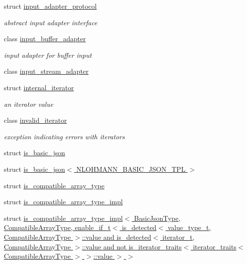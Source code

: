 \begin{DoxyCompactItemize}
struct \hyperlink{structnlohmann_1_1detail_1_1input__adapter__protocol}{input\+\_\+adapter\+\_\+protocol}
\begin{DoxyCompactList}\small\item\em abstract input adapter interface \end{DoxyCompactList}\item 
class \hyperlink{classnlohmann_1_1detail_1_1input__buffer__adapter}{input\+\_\+buffer\+\_\+adapter}
\begin{DoxyCompactList}\small\item\em input adapter for buffer input \end{DoxyCompactList}\item 
class \hyperlink{classnlohmann_1_1detail_1_1input__stream__adapter}{input\+\_\+stream\+\_\+adapter}
\item 
struct \hyperlink{structnlohmann_1_1detail_1_1internal__iterator}{internal\+\_\+iterator}
\begin{DoxyCompactList}\small\item\em an iterator value \end{DoxyCompactList}\item 
class \hyperlink{classnlohmann_1_1detail_1_1invalid__iterator}{invalid\+\_\+iterator}
\begin{DoxyCompactList}\small\item\em exception indicating errors with iterators \end{DoxyCompactList}\item 
struct \hyperlink{structnlohmann_1_1detail_1_1is__basic__json}{is\+\_\+basic\+\_\+json}
\item 
struct \hyperlink{structnlohmann_1_1detail_1_1is__basic__json_3_01NLOHMANN__BASIC__JSON__TPL_01_4}{is\+\_\+basic\+\_\+json$<$ N\+L\+O\+H\+M\+A\+N\+N\+\_\+\+B\+A\+S\+I\+C\+\_\+\+J\+S\+O\+N\+\_\+\+T\+P\+L $>$}
\item 
struct \hyperlink{structnlohmann_1_1detail_1_1is__compatible__array__type}{is\+\_\+compatible\+\_\+array\+\_\+type}
\item 
struct \hyperlink{structnlohmann_1_1detail_1_1is__compatible__array__type__impl}{is\+\_\+compatible\+\_\+array\+\_\+type\+\_\+impl}
\item 
struct \hyperlink{structnlohmann_1_1detail_1_1is__compatible__array__type__impl_3_01BasicJsonType_00_01CompatibleA2ae7cc020294dfcc2b3bca5a9db30ddf}{is\+\_\+compatible\+\_\+array\+\_\+type\+\_\+impl$<$ Basic\+Json\+Type, Compatible\+Array\+Type, enable\+\_\+if\+\_\+t$<$ is\+\_\+detected$<$ value\+\_\+type\+\_\+t, Compatible\+Array\+Type $>$\+::value and is\+\_\+detected$<$ iterator\+\_\+t, Compatible\+Array\+Type $>$\+::value and not is\+\_\+iterator\+\_\+traits$<$ iterator\+\_\+traits$<$ Compatible\+Array\+Type $>$ $>$\+::value $>$ $>$}

\end{DoxyCompactItemize}
